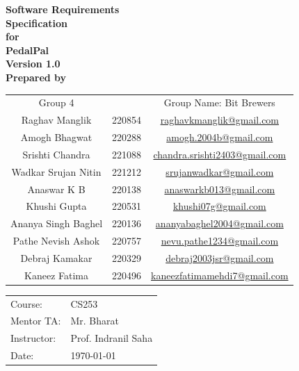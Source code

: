 \documentclass[11pt]{article}
\begin{document}
\begin{flushright}
    \textbf{{\fontsize{30}{36}\selectfont Software Requirements}\\ {\fontsize{30}{36}\selectfont Specification}\\\vspace{1cm}\huge{for}\\\vspace{1cm}\Huge{PedalPal}\\ \vspace{1.5cm}\LARGE{Version 1.0}\\\vspace{1cm}\LARGE{Prepared by}}
\end{flushright}
\vspace{1.0cm}
\large{\begin{tabular*}{\columnwidth}{@{\extracolsep{\stretch{1}}}*{3}{c}@{}}
    \Large{Group 4} & & \Large{Group Name: Bit Brewers} \\
    Raghav Manglik & 220854 & \href{mailto:raghavkmanglik@gmail.com}{raghavkmanglik@gmail.com} \\
    Amogh Bhagwat & 220288 & \href{mailto:amogh.2004b@gmail.com}{amogh.2004b@gmail.com} \\
    Srishti Chandra & 221088 & \href{mailto:chandra.srishti2403@gmail.com}{chandra.srishti2403@gmail.com} \\
    Wadkar Srujan Nitin & 221212 & \href{mailto:srujanwadkar@gmail.com}{srujanwadkar@gmail.com} \\
    Anaswar K B & 220138 & \href{mailto:anaswarkb013@gmail.com}{anaswarkb013@gmail.com} \\
    Khushi Gupta & 220531 & \href{mailto:khushi07g@gmail.com}{khushi07g@gmail.com} \\
    Ananya Singh Baghel & 220136 & \href{mailto:ananyabaghel2004@gmail.com}{ananyabaghel2004@gmail.com} \\
    Pathe Nevish Ashok & 220757 & \href{mailto:nevu.pathe1234@gmail.com}{nevu.pathe1234@gmail.com} \\
    Debraj Kamakar & 220329 & \href{mailto:debraj2003jsr@gmail.com}{debraj2003jsr@gmail.com} \\
    Kaneez Fatima & 220496 & \href{mailto:kaneezfatimamehdi7@gmail.com}{kaneezfatimamehdi7@gmail.com} \\
    
\end{tabular*}}

\vspace{2.0cm}
\begin{center}
\large{
\begin{tabular}{l l}
    Course: & CS253 \\
    Mentor TA: & Mr. Bharat \\
    Instructor: & Prof. Indranil Saha \\
    Date: & \today
\end{tabular}
}
\end{center}
\newpage
\tableofcontents
\end{document}
